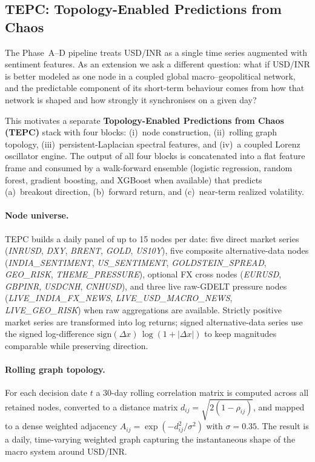 \documentclass[11pt]{article}
\begin{document}
\subsection{TEPC: Topology-Enabled Predictions from Chaos}
\label{sec:tepc}

The Phase~A--D pipeline treats USD/INR as a single time series augmented with sentiment features. As an extension we ask a different question: what if USD/INR is better modeled as one node in a coupled global macro--geopolitical network, and the predictable component of its short-term behaviour comes from how that network is shaped and how strongly it synchronises on a given day?

This motivates a separate \textbf{Topology-Enabled Predictions from Chaos (TEPC)} stack with four blocks: (i)~node construction, (ii)~rolling graph topology, (iii)~persistent-Laplacian spectral features, and (iv)~a coupled Lorenz oscillator engine. The output of all four blocks is concatenated into a flat feature frame and consumed by a walk-forward ensemble (logistic regression, random forest, gradient boosting, and XGBoost when available) that predicts (a)~breakout direction, (b)~forward return, and (c)~near-term realized volatility.

\paragraph{Node universe.}
TEPC builds a daily panel of up to 15 nodes per date: five direct market series (\textit{INRUSD}, \textit{DXY}, \textit{BRENT}, \textit{GOLD}, \textit{US10Y}), five composite alternative-data nodes (\textit{INDIA\_SENTIMENT}, \textit{US\_SENTIMENT}, \textit{GOLDSTEIN\_SPREAD}, \textit{GEO\_RISK}, \textit{THEME\_PRESSURE}), optional FX cross nodes (\textit{EURUSD}, \textit{GBPINR}, \textit{USDCNH}, \textit{CNHUSD}), and three live raw-GDELT pressure nodes (\textit{LIVE\_INDIA\_FX\_NEWS}, \textit{LIVE\_USD\_MACRO\_NEWS}, \textit{LIVE\_GEO\_RISK}) when raw aggregations are available. Strictly positive market series are transformed into log returns; signed alternative-data series use the signed log-difference $\mathrm{sign}(\Delta x)\,\log(1+|\Delta x|)$ to keep magnitudes comparable while preserving direction.

\paragraph{Rolling graph topology.}
For each decision date $t$ a 30-day rolling correlation matrix is computed across all retained nodes, converted to a distance matrix $d_{ij}=\sqrt{2(1-\rho_{ij})}$, and mapped to a dense weighted adjacency $A_{ij}=\exp(-d_{ij}^2/\sigma^2)$ with $\sigma=0.35$. The result is a daily, time-varying weighted graph capturing the instantaneous shape of the macro system around USD/INR.
\end{document}
